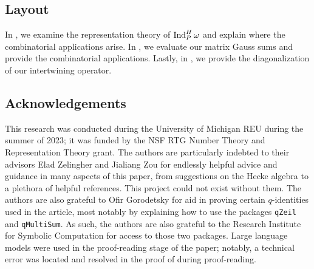 \documentclass{amsart}
\begin{document}
    

\subsection{Layout}
In , we examine the representation theory of $\operatorname{Ind}_P^H\omega$ and explain where the combinatorial applications arise. In , we evaluate our matrix Gauss sums and provide the combinatorial applications. Lastly, in , we provide the diagonalization of our intertwining operator.

\subsection{Acknowledgements}
This research was conducted during the University of Michigan REU during the summer of 2023; it was funded by the NSF RTG Number Theory and Representation Theory grant. The authors are particularly indebted to their advisors Elad Zelingher and Jialiang Zou for endlessly helpful advice and guidance in many aspects of this paper, from suggestions on the Hecke algebra to a plethora of helpful references. This project could not exist without them. The authors are also grateful to Ofir Gorodetsky for aid in proving certain $q$-identities used in the article, most notably by explaining how to use the packages \texttt{qZeil} and \texttt{qMultiSum}. As such, the authors are also grateful to the Research Institute for Symbolic Computation for access to those two packages. Large language models were used in the proof-reading stage of the paper; notably, a technical error was located and resolved in the proof of  during proof-reading.
\end{document}

